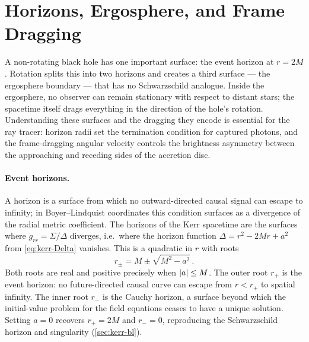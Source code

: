 \section{Horizons, Ergosphere, and Frame Dragging}
\label{sec:kerr-horizons}

A non-rotating black hole has one important surface: the event
horizon at $r = 2M$.  Rotation splits this into two horizons and
creates a third surface --- the ergosphere boundary --- that has no
Schwarzschild analogue.  Inside the ergosphere, no observer can
remain stationary with respect to distant stars; the spacetime
itself drags everything in the direction of the hole's rotation.
Understanding these surfaces and the dragging they encode is
essential for the ray tracer: horizon radii set the termination
condition for captured photons, and the frame-dragging angular
velocity controls the brightness asymmetry between the approaching
and receding sides of the accretion disc.

\paragraph{Event horizons.}

A horizon is a surface from which no outward-directed causal
signal can escape to infinity; in Boyer--Lindquist coordinates
this condition surfaces as a divergence of the radial metric
coefficient.  The horizons of the Kerr spacetime are the surfaces
where $g_{rr} = \Sigma/\Delta$ diverges, i.e.\ where the horizon
function $\Delta = r^2 - 2Mr + a^2$ from \cref{eq:kerr-Delta}
vanishes.  This is a quadratic in $r$ with roots
%
\begin{equation}
  r_\pm = M \pm \sqrt{M^2 - a^2} \,.
  \label{eq:kerr-horizons}
\end{equation}
%
Both roots are real and positive precisely when $\left\lvert a \right\rvert \leq M$.
The outer root $r_+$ is the event horizon: no future-directed
causal curve can escape from $r < r_+$ to spatial infinity.  The
inner root $r_-$ is the Cauchy horizon, a surface beyond which the
initial-value problem for the field equations ceases to have a
unique solution.
Setting $a = 0$ recovers
$r_+ = 2M$ and $r_- = 0$, reproducing the Schwarzschild
horizon and singularity (\cref{sec:kerr-bl}).

